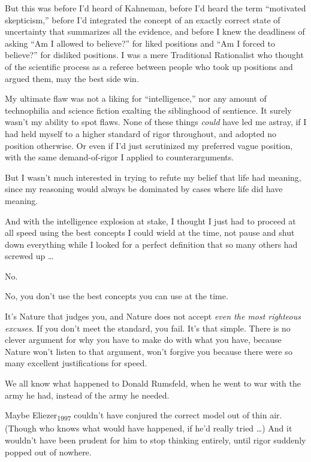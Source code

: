 {
 But this was before I'd heard of Kahneman, before
I'd heard the term ``motivated
skepticism,'' before I'd integrated
the concept of an exactly correct state of uncertainty that summarizes
all the evidence, and before I knew the deadliness of asking
``Am I allowed to believe?'' for
liked positions and ``Am I forced to
believe?'' for disliked positions. I was a mere
Traditional Rationalist who thought of the scientific process as a
referee between people who took up positions and argued them, may the
best side win.}

{
 My ultimate flaw was not a liking for
``intelligence,'' nor any amount of
technophilia and science fiction exalting the siblinghood of sentience.
It surely wasn't my ability to spot flaws. None of
these things \textit{could} have led me astray, if I had held myself to
a higher standard of rigor throughout, and adopted no position
otherwise. Or even if I'd just scrutinized my preferred
vague position, with the same demand-of-rigor I applied to
counterarguments.}

{
 But I wasn't much interested in trying to refute
my belief that life had meaning, since my reasoning would always be
dominated by cases where life did have meaning.}

{
 And with the intelligence explosion at stake, I thought I just had
to proceed at all speed using the best concepts I could wield at the
time, not pause and shut down everything while I looked for a perfect
definition that so many others had screwed up \ldots}

{
 No.}

{
 No, you don't use the best concepts you can use at
the time.}

{
 It's Nature that judges you, and Nature does not
accept \textit{even the most righteous excuses}. If you
don't meet the standard, you fail. It's
that simple. There is no clever argument for why you have to make do
with what you have, because Nature won't listen to that
argument, won't forgive you because there were so many
excellent justifications for speed.}

{
 We all know what happened to Donald Rumsfeld, when he went to war
with the army he had, instead of the army he needed.}

{
 Maybe Eliezer\textsubscript{1997} couldn't have
conjured the correct model out of thin air. (Though who knows what
would have happened, if he'd really tried \ldots) And it
wouldn't have been prudent for him to stop thinking
entirely, until rigor suddenly popped out of nowhere.}

